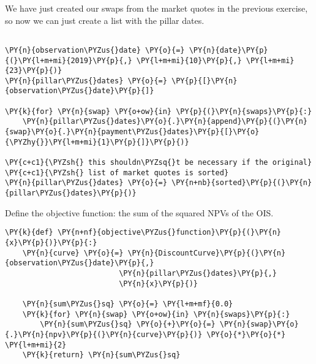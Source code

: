 \begin{Answer}
We have just created our swaps from the market quotes in the previous exercise, so now we can just create a list with the pillar dates.
\begin{codebox}[breakable, size=fbox, boxrule=1pt, pad at break*=1mm,colback=cellbackground, colframe=cellborder]
\begin{Verbatim}[commandchars=\\\{\}]

\PY{n}{observation\PYZus{}date} \PY{o}{=} \PY{n}{date}\PY{p}{(}\PY{l+m+mi}{2019}\PY{p}{,} \PY{l+m+mi}{10}\PY{p}{,} \PY{l+m+mi}{23}\PY{p}{)}
\PY{n}{pillar\PYZus{}dates} \PY{o}{=} \PY{p}{[}\PY{n}{observation\PYZus{}date}\PY{p}{]}

\PY{k}{for} \PY{n}{swap} \PY{o+ow}{in} \PY{p}{(}\PY{n}{swaps}\PY{p}{:}
    \PY{n}{pillar\PYZus{}dates}\PY{o}{.}\PY{n}{append}\PY{p}{(}\PY{n}{swap}\PY{o}{.}\PY{n}{payment\PYZus{}dates}\PY{p}{[}\PY{o}{\PYZhy{}}\PY{l+m+mi}{1}\PY{p}{]}\PY{p}{)}

\PY{c+c1}{\PYZsh{} this shouldn\PYZsq{}t be necessary if the original}
\PY{c+c1}{\PYZsh{} list of market quotes is sorted}
\PY{n}{pillar\PYZus{}dates} \PY{o}{=} \PY{n+nb}{sorted}\PY{p}{(}\PY{n}{pillar\PYZus{}dates}\PY{p}{)}
\end{Verbatim}
\end{codebox}

 Define the objective function: the sum of the squared NPVs of the OIS.

\begin{codebox}[breakable, size=fbox, boxrule=1pt, pad at break*=1mm,colback=cellbackground, colframe=cellborder]
\begin{Verbatim}[commandchars=\\\{\}]
\PY{k}{def} \PY{n+nf}{objective\PYZus{}function}\PY{p}{(}\PY{n}{x}\PY{p}{)}\PY{p}{:}
    \PY{n}{curve} \PY{o}{=} \PY{n}{DiscountCurve}\PY{p}{(}\PY{n}{observation\PYZus{}date}\PY{p}{,}
                          \PY{n}{pillar\PYZus{}dates}\PY{p}{,}
                          \PY{n}{x}\PY{p}{)}
    
    \PY{n}{sum\PYZus{}sq} \PY{o}{=} \PY{l+m+mf}{0.0}
    \PY{k}{for} \PY{n}{swap} \PY{o+ow}{in} \PY{n}{swaps}\PY{p}{:}
        \PY{n}{sum\PYZus{}sq} \PY{o}{+}\PY{o}{=} \PY{n}{swap}\PY{o}{.}\PY{n}{npv}\PY{p}{(}\PY{n}{curve}\PY{p}{)} \PY{o}{*}\PY{o}{*} \PY{l+m+mi}{2}
    \PY{k}{return} \PY{n}{sum\PYZus{}sq}
\end{Verbatim}
\end{codebox}


\end{Answer}
